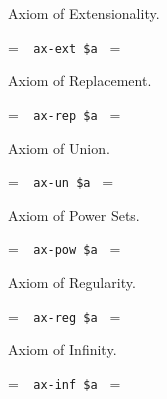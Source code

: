 \noindent Axiom of Extensionality.

\setbox\startprefix=\hbox{\tt \ \ ax-ext\ \$a\ }
\setbox\contprefix=\hbox{\tt \ \ \ \ \ \ \ \ \ \ \ \ }
\startm
\m{\vdash}\m{(}\m{\forall}\m{(}\m{\in}\m{\leftrightarrow}
\m{\in}\m{)}\m{\rightarrow}\m{=}\m{)}
\endm

\noindent Axiom of Replacement.

\setbox\startprefix=\hbox{\tt \ \ ax-rep\ \$a\ }
\setbox\contprefix=\hbox{\tt \ \ \ \ \ \ \ \ \ \ \ \ }
\startm
\m{\vdash}\m{(}\m{\forall}\m{\exists}\m{\forall}\m{(}\m{%
\forall}\m{\varphi}\m{\rightarrow}\m{=}\m{)}\m{\rightarrow}\m{%
\exists}\m{\forall}\m{(}\m{\in}\m{\leftrightarrow}\m{%
\exists}\m{(}\m{\in}\m{\wedge}\m{\forall}\m{\varphi}\m{)}%
\m{)}\m{)}
\endm

\noindent Axiom of Union.

\setbox\startprefix=\hbox{\tt \ \ ax-un\ \$a\ }
\setbox\contprefix=\hbox{\tt \ \ \ \ \ \ \ \ \ \ \ }
\startm
\m{\vdash}\m{\exists}\m{\forall}\m{(}\m{\exists}\m{(}\m{
\in}\m{\wedge}\m{\in}\m{)}\m{\rightarrow}\m{\in}\m{)}
\endm

\noindent Axiom of Power Sets.

\setbox\startprefix=\hbox{\tt \ \ ax-pow\ \$a\ }
\setbox\contprefix=\hbox{\tt \ \ \ \ \ \ \ \ \ \ \ \ }
\startm
\m{\vdash}\m{\exists}\m{\forall}\m{(}\m{\forall}\m{(}\m{
\in}\m{\rightarrow}\m{\in}\m{)}\m{\rightarrow}\m{\in}
\m{)}
\endm

\noindent Axiom of Regularity.

\setbox\startprefix=\hbox{\tt \ \ ax-reg\ \$a\ }
\setbox\contprefix=\hbox{\tt \ \ \ \ \ \ \ \ \ \ \ \ }
\startm
\m{\vdash}\m{(}\m{\exists}\m{\in}\m{\rightarrow}\m{\exists}
\m{(}\m{\in}\m{\wedge}\m{\forall}\m{(}\m{\in}\m{
\rightarrow}\m{\lnot}\m{\in}\m{)}\m{)}\m{)}
\endm

\noindent Axiom of Infinity.

\setbox\startprefix=\hbox{\tt \ \ ax-inf\ \$a\ }
\setbox\contprefix=\hbox{\tt \ \ \ \ \ \ \ \ \ \ \ \ \ \ \ }
\startm
\m{\vdash}\m{\exists}\m{(}\m{\in}\m{\wedge}\m{\forall}%
\m{(}\m{\in}\m{\rightarrow}\m{\exists}\m{(}\m{\in}\m{%
\wedge}\m{\in}\m{)}\m{)}\m{)}
\endm

